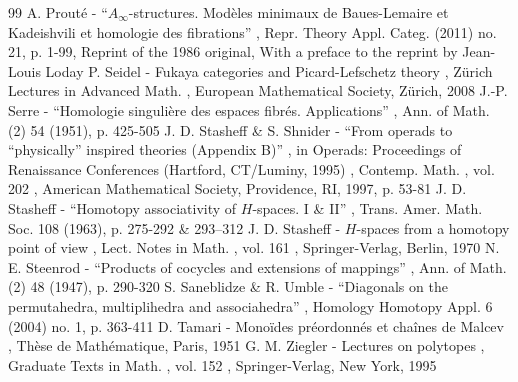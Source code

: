 \begin{thebibliography}{99}
 A. Prouté - “$A_\infty $-structures. Modèles minimaux de Baues-Lemaire et Kadeishvili et homologie des fibrations” , Repr. Theory Appl. Categ. (2011) no. 21, p. 1-99, Reprint of the 1986 original, With a preface to the reprint by Jean-Louis Loday
 P. Seidel - Fukaya categories and Picard-Lefschetz theory , Zürich Lectures in Advanced Math. , European Mathematical Society, Zürich, 2008
 J.-P. Serre - “Homologie singulière des espaces fibrés. Applications” , Ann. of Math. (2) 54 (1951), p. 425-505
 J. D. Stasheff \& S. Shnider - “From operads to “physically” inspired theories (Appendix B)” , in Operads: Proceedings of Renaissance Conferences (Hartford, CT/Luminy, 1995) , Contemp. Math. , vol. 202 , American Mathematical Society, Providence, RI, 1997, p. 53-81
 J. D. Stasheff - “Homotopy associativity of $H$-spaces. I \& II” , Trans. Amer. Math. Soc. 108 (1963), p. 275-292 \& 293–312
 J. D. Stasheff - $H$-spaces from a homotopy point of view , Lect. Notes in Math. , vol. 161 , Springer-Verlag, Berlin, 1970
 N. E. Steenrod - “Products of cocycles and extensions of mappings” , Ann. of Math. (2) 48 (1947), p. 290-320
 S. Saneblidze \& R. Umble - “Diagonals on the permutahedra, multiplihedra and associahedra” , Homology Homotopy Appl. 6 (2004) no. 1, p. 363-411
 D. Tamari - Monoïdes préordonnés et chaînes de Malcev , Thèse de Mathématique, Paris, 1951
 G. M. Ziegler - Lectures on polytopes , Graduate Texts in Math. , vol. 152 , Springer-Verlag, New York, 1995
\end{thebibliography}

